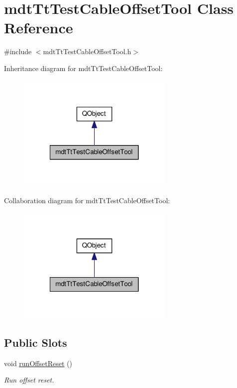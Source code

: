 \hypertarget{classmdt_tt_test_cable_offset_tool}{\section{mdt\-Tt\-Test\-Cable\-Offset\-Tool Class Reference}
\label{classmdt_tt_test_cable_offset_tool}
}


{\ttfamily \#include $<$mdt\-Tt\-Test\-Cable\-Offset\-Tool.\-h$>$}



Inheritance diagram for mdt\-Tt\-Test\-Cable\-Offset\-Tool\-:
\nopagebreak
\begin{figure}[H]
\begin{center}
\leavevmode
\includegraphics[width=212pt]{classmdt_tt_test_cable_offset_tool__inherit__graph}
\end{center}
\end{figure}


Collaboration diagram for mdt\-Tt\-Test\-Cable\-Offset\-Tool\-:
\nopagebreak
\begin{figure}[H]
\begin{center}
\leavevmode
\includegraphics[width=212pt]{classmdt_tt_test_cable_offset_tool__coll__graph}
\end{center}
\end{figure}
\subsection*{Public Slots}
\begin{DoxyCompactItemize}
\item 
void \hyperlink{classmdt_tt_test_cable_offset_tool_a350be590a6ef9009150bff7f190f44f3}{run\-Offset\-Reset} ()
\begin{DoxyCompactList}\small\item\em Run offset reset. \end{DoxyCompactList}\end{DoxyCompactItemize}
